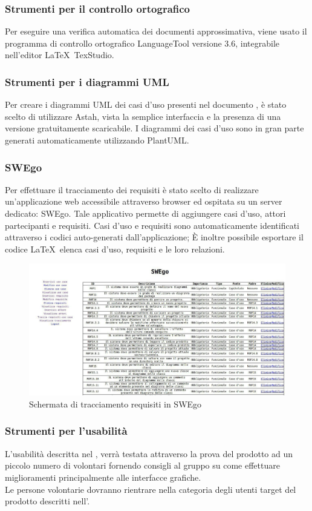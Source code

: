 \documentclass[../NormeDiProgetto.tex]{subfiles}
\begin{document}
			\subsubsection{Strumenti per il controllo ortografico}
				Per eseguire una verifica automatica dei documenti approssimativa,
				viene usato il programma di controllo ortografico LanguageTool versione 3.6, integrabile
				nell'editor \LaTeX\ TexStudio.
			\subsubsection{Strumenti per i diagrammi UML}	
				Per creare i diagrammi UML dei casi d'uso presenti nel documento \analisideirequisitiv,
				è stato scelto di utilizzare Astah, vista la semplice interfaccia e la presenza di una
				versione gratuitamente scaricabile.
				I diagrammi dei casi d'uso sono in gran parte generati automaticamente utilizzando PlantUML.
			\subsubsection{SWEgo}
				Per effettuare il tracciamento dei requisiti è stato scelto di realizzare un'applicazione
				web accessibile attraverso browser ed ospitata su un server dedicato: SWEgo.
				Tale applicativo permette di aggiungere casi d'uso, attori partecipanti e requisiti.
				Casi d'uso e requisiti sono automaticamente identificati attraverso i codici auto-generati
				dall'applicazione; È inoltre possibile esportare il codice \LaTeX\ elenca casi d'uso,
				requisiti e le loro relazioni.
				\begin{figure} [h!]
					\centering
					\includegraphics[scale=0.42]{./Immagini/SWEgo.jpg}
					\caption{Schermata di tracciamento requisiti in SWEgo}\label{}
				\end{figure}
			\subsubsection{Strumenti per l'usabilità}
				L'usabilità descritta nel \pianodiqualificav, verrà testata attraverso la prova del prodotto
				ad un piccolo numero di volontari fornendo consigli al gruppo su come effettuare
				miglioramenti principalmente alle interfacce grafiche.\\
				Le persone volontarie dovranno rientrare nella categoria degli utenti target del prodotto
				descritti nell'\analisideirequisitiv.
\end{document}

